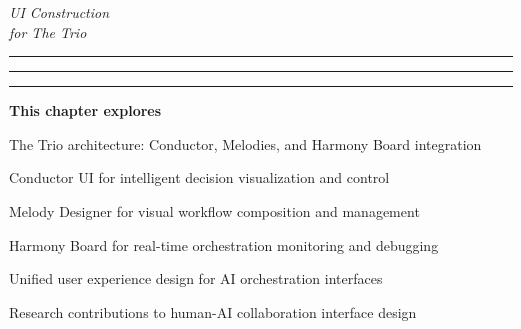 \begin{center}
{\fontsize{28}{32}\selectfont\textcolor{brandSecondary}{\textit{UI Construction}}}\\
\vspace{0.3cm}
{\fontsize{20}{24}\selectfont\textcolor{brandTertiary}{\textit{for The Trio}}}
\end{center}


\begin{center}
\textcolor{brandAccent}{
\rule{2cm}{0.8pt} \quad
\raisebox{-0.2ex}{\Large$\triangle$} \quad
\rule{4cm}{0.8pt} \quad
\raisebox{-0.2ex}{\Large$\triangle$} \quad
\rule{2cm}{0.8pt}
}
\end{center}


\begin{tcolorbox}[
    enhanced,
    colback=white,
    colframe=brandPrimary!40,
    boxrule=1pt,
    arc=12pt,
    drop shadow={brandPrimary!20},
    left=1.5cm,
    right=1.5cm,
    top=1.2cm,
    bottom=1.2cm,
    before upper={\parindent0pt}
]
\begin{center}
{\Large\textbf{\textcolor{brandPrimary}{This chapter explores}}}
\end{center}

\vspace{0.8cm}

\begin{compactlist}
    \item {\large The Trio architecture: Conductor, Melodies, and Harmony Board integration}
    \item {\large Conductor UI for intelligent decision visualization and control}
    \item {\large Melody Designer for visual workflow composition and management}
    \item {\large Harmony Board for real-time orchestration monitoring and debugging}
    \item {\large Unified user experience design for AI orchestration interfaces}
    \item {\large Research contributions to human-AI collaboration interface design}
\end{compactlist}
\end{tcolorbox}

\clearpage
